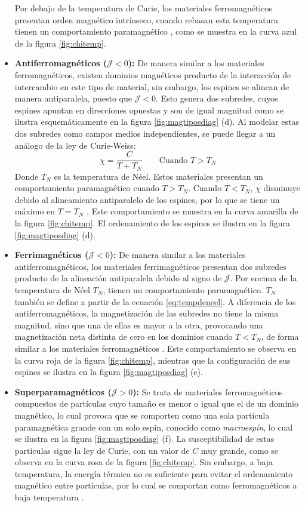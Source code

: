 \documentclass[../main.tex]{subfiles}
\begin{document}
\begin{itemize}
    Por debajo de la temperatura de Curie, los materiales ferromagnéticos presentan orden magnético intrínseco, cuando rebasan esta temperatura tienen un comportamiento paramagnético \cite{coey2010magnetism}, como se muestra en la curva azul de la figura \ref{fig:chitemp}.
    \item \textbf{Antiferromagnéticos ($\mathcal{J}<0$):} De manera similar a los materiales ferromagnéticos, existen dominios magnéticos producto de la interacción de intercambio en este tipo de material, sin embargo, los espines se alinean de manera antiparalela, puesto que $\mathcal{J}<0$. Esto genera dos subredes, cuyos espines apuntan en direcciones opuestas y son de igual magnitud como se ilustra esquemáticamente en la figura \ref{fig:magtiposdiag} (d). Al modelar estas dos subredes como campos medios independientes, se puede llegar a un análogo de la ley de Curie-Weiss:
    \begin{equation}
        \chi=\dfrac{C}{T+T_N}\qquad\text{Cuando }T>T_N
        \label{eq:tempdeneel}
    \end{equation}
    Donde $T_N$ es la temperatura de Néel. Estos materiales presentan un comportamiento paramagnético cuando $T>T_N$. Cuando $T<T_N$, $\chi$ disminuye debido al alineamiento antiparalelo de los espines, por lo que se tiene un máximo en $T=T_N$ \cite{coey2010magnetism}. Este comportamiento se muestra en la curva amarilla de la figura \ref{fig:chitemp}. El ordenamiento de los espines se ilustra en la figura \ref{fig:magtiposdiag} (d).
    \item \textbf{Ferrimagnéticos ($\mathcal{J}<0$):} De manera similar a los materiales antiferromagnéticos, los materiales ferrimagnéticos presentan dos subredes producto de la alineación antiparalela debido al signo de $\mathcal{J}$. Por encima de la temperatura de Néel $T_N$,  tienen un comportamiento paramagnético. $T_N$ también se define a partir de la ecuación \ref{eq:tempdeneel}. A diferencia de los antiferromagnéticos, la magnetización de las subredes no tiene la misma magnitud, sino que una de ellas es mayor a la otra, provocando una magnetización neta distinta de cero en los dominios cuando $T<T_N$, de forma similar a los materiales ferromagnéticos \cite{coey2010magnetism}. Este comportamiento se observa en la curva roja de la figura \ref{fig:chitemp}, mientras que la configuración de sus espines se ilustra en la figura \ref{fig:magtiposdiag} (e).
    \item \textbf{Superparamagnéticos ($\mathcal{J}>0$):} Se trata de materiales ferromagnéticos compuestos de partículas cuyo tamaño es menor o igual que el de un dominio magnético, lo cual provoca que se comporten como una sola partícula paramagnética grande con un solo espín, conocido como \textit{macroespín}, lo cual se ilustra en la figura \ref{fig:magtiposdiag} (f). La susceptibilidad de estas partículas sigue la ley de Curie, con un valor de $C$ muy grande, como se observa en la curva rosa de la figura \ref{fig:chitemp}. Sin embargo, a baja temperatura, la energía térmica no es suficiente para evitar el ordenamiento magnético entre partículas, por lo cual se comportan como ferromagnéticos a baja temperatura \cite{coey2010magnetism}.
\end{itemize}
\end{document}
